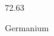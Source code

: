 \documentclass[12pt]{article}
\begin{document}
\hfill{}
\vfill
\begin{center}
  {\fontsize{50}{60}
  }

  \vspace{1em}

  72.63

Germanium
\end{center}
\vfill
\end{document}
